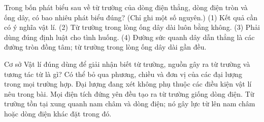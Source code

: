 \begin{ex}
Trong bốn phát biểu sau về từ trường của dòng điện thẳng, dòng điện tròn và ống dây, có bao nhiêu phát biểu đúng? (Chỉ ghi một số nguyên.) (1) Kết quả cần có ý nghĩa vật lí. (2) Từ trường trong lòng ống dây dài luôn bằng không. (3) Phải dùng đúng định luật cho tình huống. (4) Đường sức quanh dây dẫn thẳng là các đường tròn đồng tâm; từ trường trong lòng ống dây dài gần đều.
\end{ex}

\begin{ex}
Cơ sở Vật lí đúng dùng để giải nhận biết từ trường, nguồn gây ra từ trường và tương tác từ là gì?
\choice
{Có thể bỏ qua phương, chiều và đơn vị của các đại lượng trong mọi trường hợp.}
{Đại lượng đang xét không phụ thuộc các điều kiện vật lí nêu trong bài.}
{Mọi điện tích đứng yên đều tạo ra từ trường giống dòng điện.}
{\True Từ trường tồn tại xung quanh nam châm và dòng điện; nó gây lực từ lên nam châm hoặc dòng điện khác đặt trong đó.}
\end{ex}

